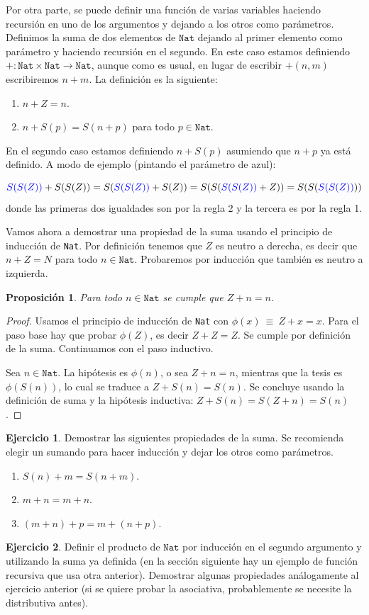 \documentclass[a4paper, 12pt]{report}
\newtheorem*{prop*}{Proposición}
\theoremstyle{definition}
\newtheorem{ejercicio}{Ejercicio}[section]
\begin{document}
Por otra parte, se puede definir una función de varias variables haciendo recursión en uno de los argumentos y dejando a los otros como parámetros. Definimos la suma de dos elementos de $\mathtt{Nat}$ dejando al primer elemento como parámetro y haciendo recursión en el segundo. En este caso estamos definiendo $+:\mathtt{Nat}\times\mathtt{Nat}\to\mathtt{Nat}$, aunque como es usual, en lugar de escribir $+(n,m)$ escribiremos $n+m$. La definición es la siguiente:
\begin{enumerate}
	\item $n + Z = n$.
	\item $n + S(p) = S(n+p)$ para todo $p\in\mathtt{Nat}$.
\end{enumerate}
En el segundo caso estamos definiendo $n+S(p)$ asumiendo que $n+p$ ya está definido. A modo de ejemplo (pintando el parámetro de azul):

$$ \textcolor{blue}{S(S(Z))} + S(S(Z)) = S(\textcolor{blue}{S(S(Z))} + S(Z)) = S(S(\textcolor{blue}{S(S(Z))} + Z)) = S(S(\textcolor{blue}{S(S(Z))}))
$$
donde las primeras dos igualdades son por la regla 2 y la tercera es por la regla 1.

Vamos ahora a demostrar una propiedad de la suma usando el principio de inducción de \texttt{Nat}. Por definición tenemos que $Z$ es neutro a derecha, es decir que $n+Z=N$ para todo $n\in\mathtt{Nat}$. Probaremos por inducción que también es neutro a izquierda.

\begin{prop*}
	Para todo $n\in\mathtt{Nat}$ se cumple que $Z+n=n$.
\end{prop*}
\begin{proof}
	Usamos el principio de inducción de \texttt{Nat} con $\phi(x)~\equiv~ Z+x=x$. Para el paso base hay que probar $\phi(Z)$, es decir $Z+Z=Z$. Se cumple por definición de la suma. Continuamos con el paso inductivo.
	
	Sea $n\in\mathtt{Nat}$. La hipótesis es $\phi(n)$, o sea $Z+n=n$, mientras que la tesis es $\phi(S(n))$, lo cual se traduce a $Z+S(n)=S(n)$. Se concluye usando la definición de suma y la hipótesis inductiva: $Z+S(n) = S(Z+n) = S(n)$.
\end{proof}
\begin{ejercicio}
	Demostrar las siguientes propiedades de la suma. Se recomienda elegir un sumando para hacer inducción y dejar los otros como parámetros.
	\begin{enumerate}
		\item $S(n)+m = S(n+m)$.
		\item $m+n = m+n$.
		\item $(m+n)+p = m+(n+p)$.
	\end{enumerate}
	
\end{ejercicio}
\begin{ejercicio}
	Definir el producto de $\mathtt{Nat}$ por inducción en el segundo argumento y utilizando la suma ya definida (en la sección siguiente hay un ejemplo de función recursiva que usa otra anterior). Demostrar algunas propiedades análogamente al ejercicio anterior (si se quiere probar la asociativa, probablemente se necesite la distributiva antes).
\end{ejercicio}
\end{document}
